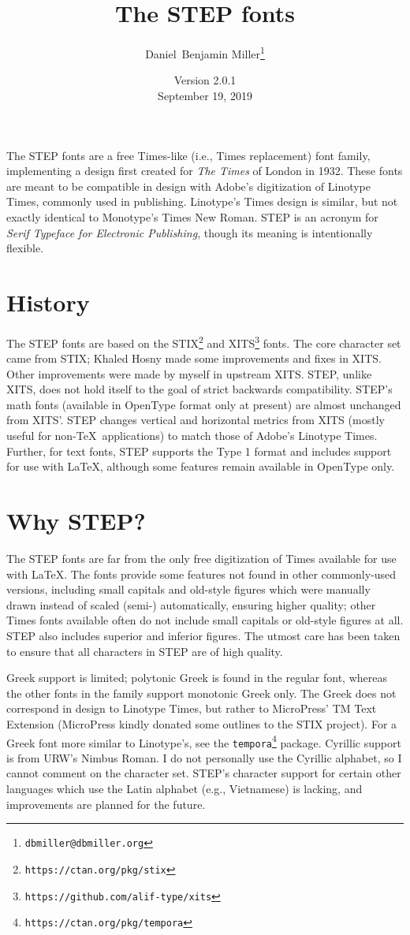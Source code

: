 \documentclass[12pt]{article}
\title{The STEP fonts}
\date{Version 2.0.1\\September 19, 2019}
\author{Daniel~Benjamin Miller\thanks{\texttt{dbmiller@dbmiller.org}}}
\begin{document}
\maketitle
The STEP fonts are a free Times-like (i.e., Times replacement) font family, implementing a design first created for \textit{The Times} of London in 1932. These fonts are meant to be compatible in design with Adobe's digitization of Linotype Times, commonly used in publishing. Linotype's Times design is similar, but not exactly identical to Monotype's Times New Roman. STEP is an acronym for \textit{Serif Typeface for Electronic Publishing}, though its meaning is intentionally flexible.
\section{History}
The STEP fonts are based on the STIX\footnote{\texttt{https://ctan.org/pkg/stix}} and XITS\footnote{\texttt{https://github.com/alif-type/xits}} fonts. The core character set came from STIX; Khaled Hosny made some improvements and fixes in XITS. Other improvements were made by myself in upstream XITS. STEP, unlike XITS, does not hold itself to the goal of strict backwards compatibility. STEP's math fonts (available in OpenType format only at present) are almost unchanged from XITS'. STEP changes vertical and horizontal metrics from XITS (mostly useful for non-\TeX\ applications) to match those of Adobe's Linotype Times. Further, for text fonts, STEP supports the Type 1 format and includes support for use with \LaTeX, although some features remain available in OpenType only.
\section{Why STEP?}
The STEP fonts are far from the only free digitization of Times available for use with \LaTeX. The fonts provide some features not found in other commonly-used versions, including small capitals and old-style figures which were manually drawn instead of scaled (semi-) automatically, ensuring higher quality; other Times fonts available often do not include small capitals or old-style figures at all. STEP also includes superior and inferior figures. The utmost care has been taken to ensure that all characters in STEP are of high quality.

Greek support is limited; polytonic Greek is found in the regular font, whereas the other fonts in the family support monotonic Greek only. The Greek does not correspond in design to Linotype Times, but rather to MicroPress' TM Text Extension (MicroPress kindly donated some outlines to the STIX project). For a Greek font more similar to Linotype's, see the \texttt{tempora}\footnote{\texttt{https://ctan.org/pkg/tempora}} package. Cyrillic support is from URW's Nimbus Roman. I do not personally use the Cyrillic alphabet, so I cannot comment on the character set. STEP's character support for certain other languages which use the Latin alphabet (e.g., Vietnamese) is lacking, and improvements are planned for the future.
\end{document}
